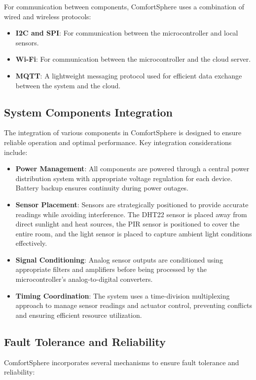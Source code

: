 \documentclass[a4paper]{scrartcl}
\begin{document}
	For communication between components, ComfortSphere uses a combination of wired and wireless protocols:
	
	\begin{itemize}
		\item \textbf{I2C and SPI}: For communication between the microcontroller and local sensors.
		\item \textbf{Wi-Fi}: For communication between the microcontroller and the cloud server.
		\item \textbf{MQTT}: A lightweight messaging protocol used for efficient data exchange between the system and the cloud.
	\end{itemize}
	
	\subsection{System Components Integration}
	The integration of various components in ComfortSphere is designed to ensure reliable operation and optimal performance. Key integration considerations include:
	
	\begin{itemize}
		\item \textbf{Power Management}: All components are powered through a central power distribution system with appropriate voltage regulation for each device. Battery backup ensures continuity during power outages.
		\item \textbf{Sensor Placement}: Sensors are strategically positioned to provide accurate readings while avoiding interference. The DHT22 sensor is placed away from direct sunlight and heat sources, the PIR sensor is positioned to cover the entire room, and the light sensor is placed to capture ambient light conditions effectively.
		\item \textbf{Signal Conditioning}: Analog sensor outputs are conditioned using appropriate filters and amplifiers before being processed by the microcontroller's analog-to-digital converters.
		\item \textbf{Timing Coordination}: The system uses a time-division multiplexing approach to manage sensor readings and actuator control, preventing conflicts and ensuring efficient resource utilization.
	\end{itemize}
	
	\subsection{Fault Tolerance and Reliability}
	ComfortSphere incorporates several mechanisms to ensure fault tolerance and reliability:
	
\end{document}
